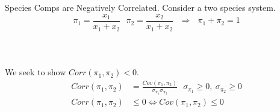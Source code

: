 \documentclass[ xcolor = pdftex, dvipsnames, table ]{beamer}
\begin{document}
\subsection{}
\begin{frame}{Species Comps are Negatively Correlated.}
	Consider a two species system. 
	\begin{equation*}
	\pi_1=\frac{x_1}{x_1+x_2} ~~~ \pi_2=\frac{x_2}{x_1+x_2} ~~~ \Rightarrow ~~~ \pi_1+\pi_2=1
	\end{equation*}
	\\$~$\\$~$\\
	We seek to show $Corr(\pi_{1}, \pi_{2})<0$.
	\\
	\begin{align*}
		Corr(\pi_{1}, \pi_{2}) &= \frac{Cov(\pi_{1}, \pi_{2})}{\sigma_{\pi_{1}}\sigma_{\pi_{2}}} ~~~ \sigma_{\pi_{1}}\ge0,~ \sigma_{\pi_{2}}\ge0 \nonumber\\
		Corr(\pi_{1}, \pi_{2}) &\le 0 \iff Cov(\pi_{1}, \pi_{2}) \le 0 \nonumber\\\nonumber\\
	\end{align*}
\end{frame}

%
%
\end{document}
